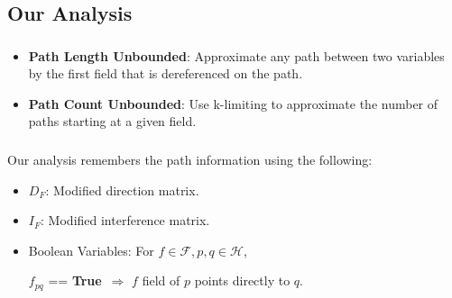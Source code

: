 \documentclass[mathserif,10pt]{beamer}
\newcommand{\cmt}[1]{}
\newcommand{\p}{\ensuremath{p}}
\newcommand{\q}{\ensuremath{q}}
\newcommand{\drct}{\ensuremath{D}}
\newcommand{\indrct}{\ensuremath{I}}
\newcommand{\heap}{\ensuremath{\mathcal{H}}}
\newcommand{\fields}{\ensuremath{\mathcal{F}}}
\newcommand{\true}{\textbf{True}}
\begin{document}
\subsection{Our Analysis}
\frame
{
	\frametitle{\subsecname}
	\begin{itemize}
	\item {\blue \textbf{Path Length Unbounded}}: \pause Approximate any path between two variables by the first field that is dereferenced on the path. 
	\pause
	\item  {\blue \textbf{Path Count Unbounded}}: \pause Use k-limiting to approximate the number of paths starting at a given field.
	\end{itemize}
}
\frame
{
	\frametitle{\subsecname}
	
	Our analysis remembers the path information using the following:
	\begin{itemize}
	\item  {\blue $D_F$}: Modified direction matrix. \cmt{ that stores the first fields of the paths between two pointers.}
	\pause
	\item {\blue $I_F$}: Modified interference matrix. \cmt{ that stores the pairs of first fields corresponding to the pairs of interfering paths.}
	\pause
	\item {\blue Boolean Variables}: For $f \in \fields, \p, \q \in \heap$, \\ 
			\begin{center}
			$f_{pq}$ == \true\ $ \Rightarrow$  $f$ field of $\p$ points directly to $\q$. 
			\end{center}
	
	\cmt{Field connectivity information: Remember the fields directly connecting two pointer variables.}
	\end{itemize}
}

\cmt{ NOT INCLUDED
\subsection{Notion of Path}
\frame
{
	\frametitle{\subsecname}
	\begin{itemize}
	\item A path from $\p$ to $\q$ is the sequence of pointer fields that need to be traversed in 
			the heap to reach from $\p$ to $\q$.
	\item Path length may be unbounded, so we consider only the first field of a path.
	\item For a path of length one (direct path) ($f_\drct$); For a path of length greater than one
			(indirect path) ($f_\indrct$).
	\item Possible to have multiple indirect paths starting with the same field : k-limiting, beyond k treat the number 
			of paths to be $\infty$.
	\end{itemize}
}
}
\end{document}
